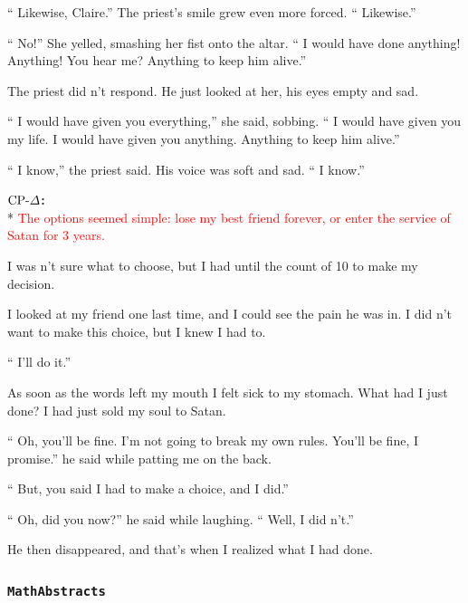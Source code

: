 \begin{breakablefigure}
\begin{cpfusetextbox}
 `` Likewise, Claire.'' The priest's smile grew even more forced. `` Likewise.'' 
 
 `` No!'' She yelled, smashing her fist onto the altar. `` I would have done anything! Anything! You hear me? Anything to keep him alive.'' 
 
 The priest did n't respond. He just looked at her, his eyes empty and sad. 
 
 `` I would have given you everything,'' she said, sobbing. `` I would have given you my life. I would have given you anything. Anything to keep him alive.'' 
 
 `` I know,'' the priest said. His voice was soft and sad. `` I know.''

\vspace{8pt}
        \textbf{\(\text{CP-}\Delta\):}\\*
\textcolor{red}{The options seemed simple: lose my best friend forever, or enter the service of Satan for 3 years.} 
 
 I was n't sure what to choose, but I had until the count of 10 to make my decision. 
 
 I looked at my friend one last time, and I could see the pain he was in. I did n't want to make this choice, but I knew I had to. 
 
 `` I'll do it.'' 
 
 As soon as the words left my mouth I felt sick to my stomach. What had I just done? I had just sold my soul to Satan. 
 
 `` Oh, you'll be fine. I'm not going to break my own rules. You'll be fine, I promise.'' he said while patting me on the back. 
 
 `` But, you said I had to make a choice, and I did.'' 
 
 `` Oh, did you now?'' he said while laughing. `` Well, I did n't.'' 
 
 He then disappeared, and that's when I realized what I had done.
    \end{cpfusetextbox}
    \label{fig:example1_story}
\end{breakablefigure}


\FloatBarrier

\subsubsection*{\texttt{MathAbstracts}}


